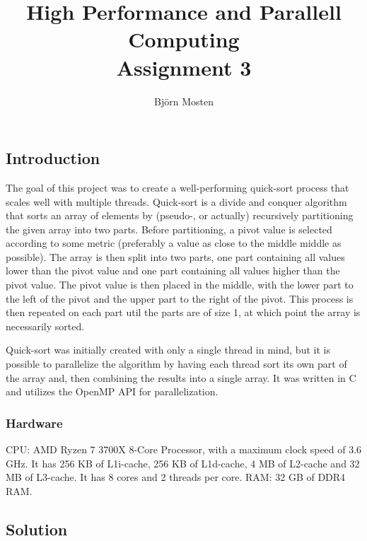\documentclass{report}
\title{\Huge{High Performance and Parallell Computing}\\Assignment 3}
\author{\huge{Björn Mosten}}
\date{}
\begin{document}
\maketitle
\newpage%
\tableofcontents
\pagebreak

\chapter{}
\setcounter{section}{1}
\section{Introduction}
The goal of this project was to create a well-performing quick-sort process that scales well with multiple threads.
Quick-sort is a divide and conquer algorithm that sorts an array of elements by (pseudo-, or actually) recursively partitioning the given array into two parts. Before partitioning, a pivot value is selected according to some metric (preferably a value as close to the middle middle as possible). 
The array is then split into two parts, one part containing all values lower than the pivot value and one part containing all values higher than the pivot value. The pivot value is then placed in the middle, with the lower part to the left of the pivot and the upper part to the right of the pivot. 
This process is then repeated on each part util the parts are of size 1, at which point the array is necessarily sorted.

Quick-sort was initially created with only a single thread in mind, but it is possible to parallelize the algorithm by having each thread sort its own part of the array and, 
then combining the results into a single array.
It was written in C and utilizes the OpenMP API for parallelization.



\subsection{Hardware}
CPU: AMD Ryzen 7 3700X 8-Core Processor, with a maximum clock speed of 3.6 GHz. It has 256 KB of L1i-cache, 256 KB of L1d-cache, 4 MB of L2-cache and 32 MB of L3-cache. It has 8 cores and 2 threads per core.
RAM: 32 GB of DDR4 RAM.

\section{Solution}
\end{document}
